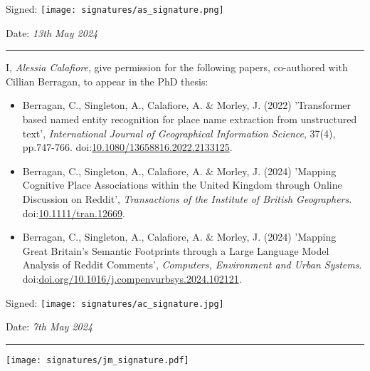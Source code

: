 \vspace{\fill}

\noindent Signed: \texttt{[image: signatures/as\_signature.png]}
 
\noindent Date: \textit{13th May 2024}\\
\rule[0.5em]{25em}{0.5pt} %

\newpage

I, \textit{Alessia Calafiore}, give permission for the following papers, co-authored with Cillian Berragan, to appear in the PhD thesis:

\begin{itemize}
\item Berragan, C., Singleton, A., Calafiore, A. \& Morley, J. (2022) 'Transformer based named entity recognition for place name extraction from unstructured text', \textit{International Journal of Geographical Information Science}, 37(4), pp.747-766. doi:\href{https://doi.org/10.1080/13658816.2022.2133125}{10.1080/13658816.2022.2133125}.
\item Berragan, C., Singleton, A., Calafiore, A. \& Morley, J. (2024) 'Mapping Cognitive Place Associations within the United Kingdom through Online Discussion on Reddit', \textit{Transactions of the Institute of British Geographers}. doi:\href{https://doi.org/10.1111/tran.12669}{10.1111/tran.12669}.
\item Berragan, C., Singleton, A., Calafiore, A. \& Morley, J. (2024) 'Mapping Great Britain's Semantic Footprints through a Large Language Model Analysis of Reddit Comments', \textit{Computers, Environment and Urban Systems}. doi:\href{https://doi.org/10.1016/j.compenvurbsys.2024.102121}{doi.org/10.1016/j.compenvurbsys.2024.102121}.\\
\end{itemize}

\vspace{\fill}

\noindent Signed: \texttt{[image: signatures/ac\_signature.jpg]}
 
\noindent Date: \textit{7th May 2024}\\
\rule[0.5em]{25em}{0.5pt} %

\newpage

\texttt{[image: signatures/jm\_signature.pdf]}
